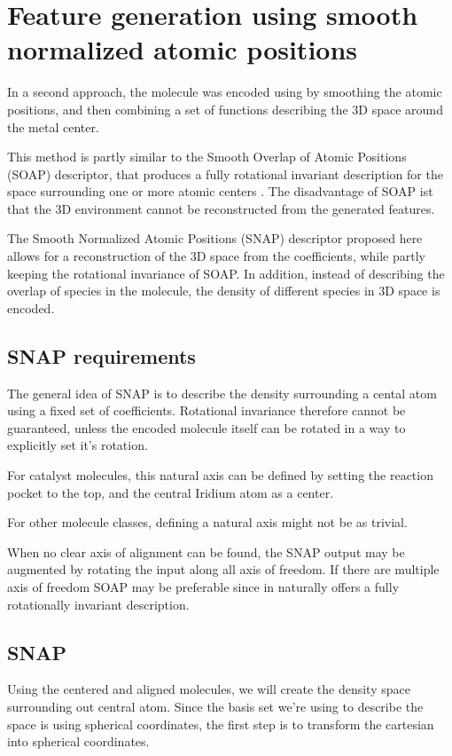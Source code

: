 \section{Feature generation using smooth normalized atomic positions}

In a second approach, the molecule was encoded using by smoothing the atomic positions, 
and then combining a set of functions describing the 3D space around the metal center.

This method is partly similar to the Smooth Overlap of Atomic Positions (SOAP) descriptor, that produces a 
fully rotational invariant description for the space surrounding one or more atomic centers \cite{Bart_k_2013}.
The disadvantage of SOAP ist that the 3D environment cannot be reconstructed from the generated features.

The Smooth Normalized Atomic Positions (SNAP) descriptor proposed here allows for a reconstruction of the 3D space from the coefficients, 
while partly keeping the rotational invariance of SOAP. 
In addition, instead of describing the overlap of species in the molecule, the
density of different species in 3D space is encoded.

\subsection{SNAP requirements}

The general idea of SNAP is to describe the density surrounding a cental atom using a fixed set of coefficients.
Rotational invariance therefore cannot be guaranteed, unless the encoded molecule itself can be rotated in a way to explicitly set it's rotation.

For catalyst molecules, this natural axis can be defined by setting the reaction pocket to the top, and the central Iridium atom as a center.

For other molecule classes, defining a natural axis might not be as trivial.

When no clear axis of alignment can be found, the SNAP output may be augmented by rotating the input along all axis of freedom.
If there are multiple axis of freedom SOAP may be preferable since in naturally offers a fully rotationally invariant description.

\subsection{SNAP}

Using the centered and aligned molecules, we will create the density space surrounding out central atom.
Since the basis set we're using to describe the space is using spherical coordinates, the first step is to transform the cartesian into spherical coordinates.

